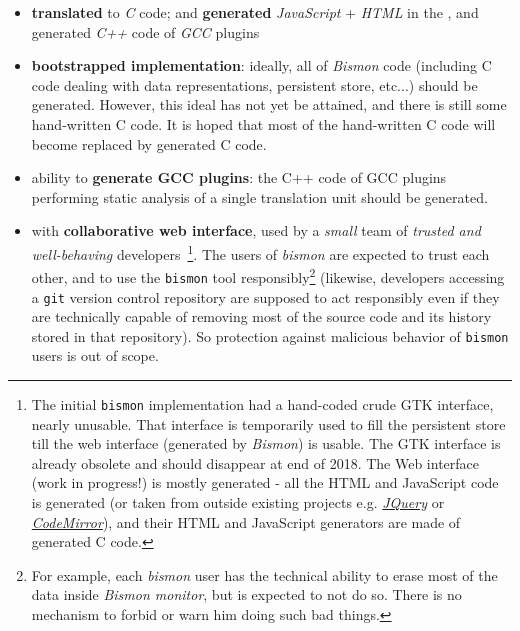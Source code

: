 \begin{itemize}
    \item \textbf{translated} to \emph{C} code; and \textbf{generated}
      \emph{JavaScript} + \emph{HTML} in the , and generated
      \emph{C++} code of \emph{GCC} plugins

    \item \textbf{bootstrapped implementation}: ideally, all of
      \textit{Bismon} code (including C code dealing with data
      representations, persistent store, etc...) should be
      generated. However, this ideal has not yet be attained, and
      there is still some hand-written C code. It is hoped that most
      of the hand-written C code will become replaced by generated C
      code.
    \item ability to \textbf{generate GCC plugins}: the C++ code of
      GCC plugins performing static analysis of a single translation
      unit should be generated.

    \item with \textbf{collaborative web interface}, used by a
      \emph{small} team of \emph{trusted and well-behaving}
      developers~\footnote{The initial \texttt{bismon} implementation
        had a hand-coded crude GTK interface, nearly unusable. That
        interface is temporarily used to fill the persistent store
        till the web interface (generated by \emph{Bismon}) is
        usable. The GTK interface is already obsolete and should
        disappear at end of 2018. The Web interface (work in
        progress!) is mostly generated - all the HTML and JavaScript
        code is generated (or taken from outside existing projects
        e.g. \href{http://jquery.com/}{\emph{JQuery}} or
        \href{http://codemirror.net/}{\emph{CodeMirror}}), and their
        HTML and JavaScript generators are made of generated C
        code.}. The users of \emph{bismon} are expected to trust each
      other, and to use the \texttt{bismon} tool
      responsibly\footnote{For example, each \emph{bismon} user has
        the technical ability to erase most of the data inside
        \textit{Bismon monitor}, but is expected to not do so. There
        is no mechanism to forbid or warn him doing such bad things.}
      (likewise, developers accessing a \texttt{git} version control
      repository are supposed to act responsibly even if they are
      technically capable of removing most of the source code and its
      history stored in that repository). So protection against
      malicious behavior of \texttt{bismon} users is out of scope.


\end{itemize}
